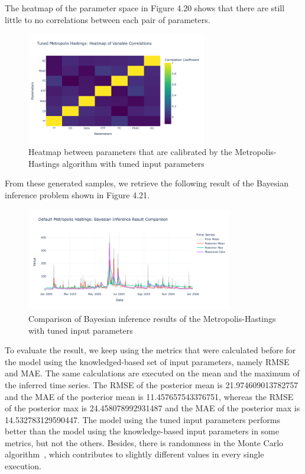 The heatmap of the parameter space in Figure 4.20 shows that there are still little to no correlations between each pair of parameters.
\begin{figure}[H]
    \centering
    \includegraphics[width=0.7\textwidth]{figures/basic_mh/tuned_mh/tuned_mh_heatmap.png}
    \captionsetup{width=.8\textwidth}
    \caption{Heatmap between parameters that are calibrated by the Metropolis-Hastings algorithm with tuned input parameters}
    \label{fig:enter-label}
\end{figure}

From these generated samples, we retrieve the following result of the Bayesian inference problem shown in Figure 4.21.

\begin{figure}[H]
    \centering
    \includegraphics[width=0.8\textwidth] {figures/basic_mh/tuned_mh/tuned_mh_bayes.png}
    \captionsetup{width=.8\textwidth}
    \caption{Comparison of Bayesian inference results of the Metropolis-Hastings with tuned input parameters}
    \label{fig:enter-label}
\end{figure}

To evaluate the result, we keep using the metrics that were calculated before for the model using the knowledged-based set of input parameters, namely RMSE and MAE. The same calculations are executed on the mean and the maximum of the inferred time series. The RMSE of the posterior mean is 21.974609013782757 and the MAE of the posterior mean is 11.457657543376751, whereas the RMSE of the posterior max is 24.458078992931487 and the MAE of the posterior max is 14.532783129590447. The model using the tuned input parameters performs better than the model using the knowledge-based input parameters in some metrics, but not the others. Besides, there is randomness in the Monte Carlo algorithm~\cite{monte_carlo_randomness}, which contributes to slightly different values in every single execution.

